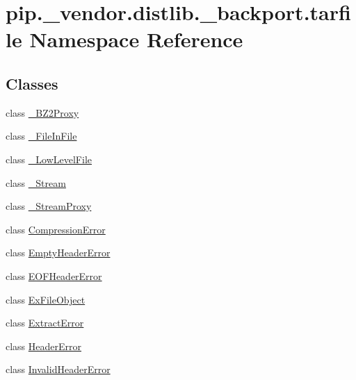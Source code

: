 \hypertarget{namespacepip_1_1__vendor_1_1distlib_1_1__backport_1_1tarfile}{}\section{pip.\+\_\+vendor.\+distlib.\+\_\+backport.\+tarfile Namespace Reference}
\label{namespacepip_1_1__vendor_1_1distlib_1_1__backport_1_1tarfile}
\subsection*{Classes}
\begin{DoxyCompactItemize}
\item 
class \hyperlink{classpip_1_1__vendor_1_1distlib_1_1__backport_1_1tarfile_1_1__BZ2Proxy}{\+\_\+\+B\+Z2\+Proxy}
\item 
class \hyperlink{classpip_1_1__vendor_1_1distlib_1_1__backport_1_1tarfile_1_1__FileInFile}{\+\_\+\+File\+In\+File}
\item 
class \hyperlink{classpip_1_1__vendor_1_1distlib_1_1__backport_1_1tarfile_1_1__LowLevelFile}{\+\_\+\+Low\+Level\+File}
\item 
class \hyperlink{classpip_1_1__vendor_1_1distlib_1_1__backport_1_1tarfile_1_1__Stream}{\+\_\+\+Stream}
\item 
class \hyperlink{classpip_1_1__vendor_1_1distlib_1_1__backport_1_1tarfile_1_1__StreamProxy}{\+\_\+\+Stream\+Proxy}
\item 
class \hyperlink{classpip_1_1__vendor_1_1distlib_1_1__backport_1_1tarfile_1_1CompressionError}{Compression\+Error}
\item 
class \hyperlink{classpip_1_1__vendor_1_1distlib_1_1__backport_1_1tarfile_1_1EmptyHeaderError}{Empty\+Header\+Error}
\item 
class \hyperlink{classpip_1_1__vendor_1_1distlib_1_1__backport_1_1tarfile_1_1EOFHeaderError}{E\+O\+F\+Header\+Error}
\item 
class \hyperlink{classpip_1_1__vendor_1_1distlib_1_1__backport_1_1tarfile_1_1ExFileObject}{Ex\+File\+Object}
\item 
class \hyperlink{classpip_1_1__vendor_1_1distlib_1_1__backport_1_1tarfile_1_1ExtractError}{Extract\+Error}
\item 
class \hyperlink{classpip_1_1__vendor_1_1distlib_1_1__backport_1_1tarfile_1_1HeaderError}{Header\+Error}
\item 
class \hyperlink{classpip_1_1__vendor_1_1distlib_1_1__backport_1_1tarfile_1_1InvalidHeaderError}{Invalid\+Header\+Error}

\end{DoxyCompactItemize}
